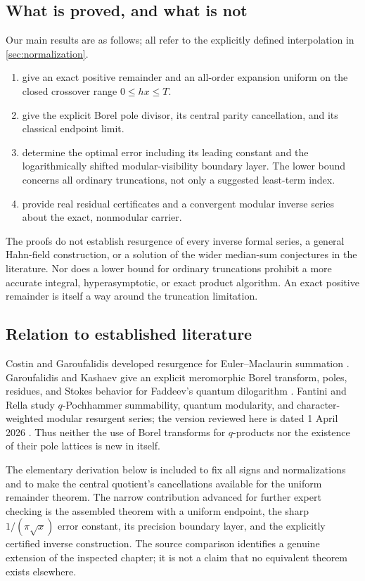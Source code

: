 \documentclass[11pt,a4paper]{article}
\theoremstyle{definition}
\theoremstyle{remark}
\begin{document}
\subsection{What is proved, and what is not}
Our main results are as follows; all refer to the explicitly defined
interpolation in \cref{sec:normalization}.
\begin{enumerate}[label=(\roman*),leftmargin=2em]
\item {} give an exact positive remainder and
an all-order expansion uniform on the closed crossover range $0\le hx\le T$.
\item {} give the explicit Borel pole divisor,
its central parity cancellation, and its classical endpoint limit.
\item {} determine the optimal error including
its leading constant and the logarithmically shifted modular-visibility
boundary layer. The lower bound concerns all ordinary truncations, not only
a suggested least-term index.
\item {} provide real residual certificates and a
convergent modular inverse series about the exact, nonmodular carrier.
\end{enumerate}
The proofs do not establish resurgence of every inverse formal series,
a general Hahn-field construction, or a solution of the wider median-sum
conjectures in the literature. Nor does a lower bound for ordinary
truncations prohibit a more accurate integral, hyperasymptotic, or exact
product algorithm. An exact positive remainder is itself a way around the
truncation limitation.

\subsection{Relation to established literature}
Costin and Garoufalidis developed resurgence for Euler--Maclaurin
summation \cite{costingaroufalidis}. Garoufalidis and Kashaev give an explicit
meromorphic Borel transform, poles, residues, and Stokes behavior for
Faddeev's quantum dilogarithm \cite{garoufalidiskashaev}. Fantini and Rella
study $q$-Pochhammer summability, quantum modularity, and character-weighted
modular resurgent series; the version reviewed here is dated 1 April 2026
\cite{fantinirella}. Thus neither the use of Borel transforms for
$q$-products nor the existence of their pole lattices is new in itself.

The elementary derivation below is included to fix all signs and
normalizations and to make the central quotient's cancellations available
for the uniform remainder theorem. The narrow contribution advanced for
further expert checking is the assembled theorem with a uniform endpoint,
the sharp $1/(\pi\sqrt{x})$ error constant, its precision boundary layer,
and the explicitly certified inverse construction. The source comparison
identifies a genuine extension of the inspected chapter; it is not a claim
that no equivalent theorem exists elsewhere.
\end{document}
